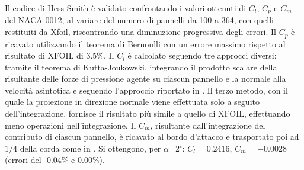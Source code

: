 \documentclass{jfm}
\begin{document}
Il codice di Hess-Smith è validato confrontando i valori ottenuti di $C_l$, $C_p$ e $C_m$ del NACA 0012, al variare del numero di pannelli da 100 a 364, con quelli restituiti da Xfoil, riscontrando una diminuzione progressiva degli errori. Il $C_p$ è ricavato utilizzando il teorema di Bernoulli con un errore massimo rispetto al risultato di XFOIL di $3.5\%$. Il $C_l$ è calcolato seguendo tre approcci diversi: tramite il teorema di Kutta-Joukowski, integrando il prodotto scalare della risultante delle forze di pressione agente su ciascun pannello e la normale alla velocità asintotica e seguendo l'approccio riportato in \cite{Foa}.
Il terzo metodo, con il quale la proiezione in direzione normale viene effettuata solo a seguito dell'integrazione, fornisce il risultato più simile a quello di XFOIL, effettuando meno operazioni nell'integrazione. Il $C_m$, risultante dall'integrazione del contributo di ciascun pannello, è ricavato al bordo d'attacco e trasportato poi ad $1/4$ della corda come in \cite{hs}. Si ottengono, per $\alpha$=2$^{\circ}$: $C_l=0.2416$, $C_m=-0.0028$ (errori del -0.04\% e 0.00\%).
\end{document}
